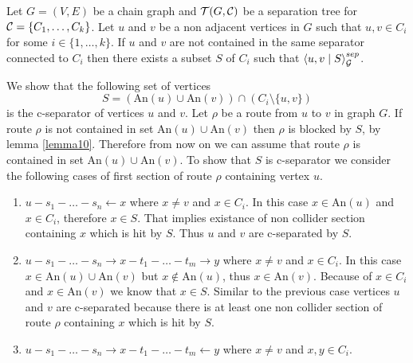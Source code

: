 \begin{lemma} \label{lemma11}
	Let $G = (V, E)$ be a chain graph and $\mathcal{T}(G, \mathcal{C})$ be a separation tree for $\mathcal{C} = \{C_1, \dots, C_k \}$. 
	Let $u$ and $v$ be a non adjacent vertices in $G$ such that $u, v \in C_i$ for some $i \in \{1, \dots, k \}$. 
	If $u$ and $v$ are not contained in the same separator connected to $C_i$ then there exists a subset $S$ of $C_i$ such that
	$\left\langle u , v \mid S \right\rangle_{\mathcal{G}}^{sep}$.
\end{lemma}

\begin{prf}
	We show that the following set of vertices 
	\begin{equation} \label{eq:S}
		S = \left( \mbox{An}(u) \cup \mbox{An}(v) \right) \cap \left( C_i \setminus \{ u, v\} \right)
	\end{equation} 
	is the c-separator of vertices $u$ and $v$. Let $\rho$ be a route from $u$ to $v$ in graph $G$. If route $\rho$ is not contained in 
	set $\mbox{An}(u) \cup \mbox{An}(v)$ then $\rho$ is blocked by $S$, by lemma \ref{lemma10}. Therefore from now on we can assume that
	route $\rho$ is contained in set $\mbox{An}(u) \cup \mbox{An}(v)$. To show that $S$ is c-separator we consider the following cases of
	first section of route $\rho$ containing vertex $u$.

	\begin{enumerate}
		\item $u - s_1 - \dots - s_n \leftarrow x$ where $x \neq v$ and $x \in C_i$.
			In this case $x \in \mbox{An}(u)$ and $x\in C_i$, therefore $x \in S$. That implies
			existance of non collider section containing $x$ which is hit by $S$. Thus $u$ and $v$ 
			are c-separated by $S$.

		\item $u - s_1 - \dots - s_n \rightarrow x - t_1 - \dots - t_m \rightarrow y$ where $x \neq v$ and $x \in C_i$.
			In this case $x \in \mbox{An}(u) \cup \mbox{An}(v)$ but $x \notin \mbox{An}(u)$, thus $x \in \mbox{An}(v)$.
			Because of $x \in C_i$ and $x \in \mbox{An}(v)$ we know that $x \in S$. Similar to the previous case
			vertices $u$ and $v$ are c-separated because there is at least one non collider section of route $\rho$ 
			containing $x$ which is hit by $S$.

		\item $u - s_1 - \dots - s_n \rightarrow x - t_1 - \dots - t_m \leftarrow y$ where $x \neq v$ and $x,y \in C_i$.

	\end{enumerate}
	
	
\end{prf}











